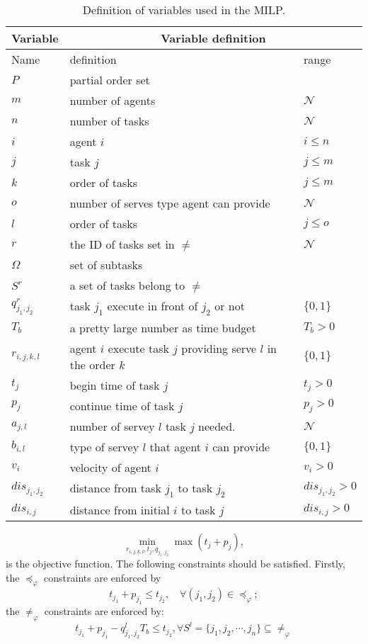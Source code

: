 \begin{table}[t]
	\begin{tabular}{|l|p{}|p{}|}\hline
		Variable &\multicolumn{2}{c|}{ Variable definition }\\\hline
		Name & definition & range \\
		$P$ & partial order set& \\
		$m$  & number of agents & $\mathcal{N}$\\
		$n$ & number of tasks & $\mathcal{N}$ \\
		$i$ & agent $i$ & $i\leq n$\\
		$j$ & task $j$ & $j\leq m$	\\
		$k$ & order of tasks & $j\leq m$\\
		$o$ & number of serves type agent can provide & $ \mathcal{N}$\\
		$l$ & order of tasks & $j\leq o$\\
		$r$ & the ID of tasks set in $\neq$ & $\mathcal{N}$\\
		$\Omega$ & set of subtasks &\\
		$S^r$& a set of tasks belong to $\neq$ &\\
		$q^r_{j_1,j_2}$ &task $j_1$ execute in front of $j_2$ or not& $\{0,1\}$\\
		$T_b$ & a pretty large number as time budget & $T_b>0$ \\
		$r_{i,j,k,l}$ & agent $i$ execute task $j$ providing serve $l$ in the order $k$ & $\{0,1\}$\\
		$t_j$ & begin time of task $j$ & $t_j>0$ \\
		$p_j$ & continue time of task $j$ & $p_j >0$\\
		$a_{j,l}$ & number of servey $l$ task $j$ needed. & $\mathcal{N}$\\
		$b_{i,l}$ & type of servey $l$ that agent $i$ can provide & $\{0,1\}$ \\
		$v_i$ & velocity of agent $i$ &   $v_i>0$\\
		$dis_{j_1,j_2}$ & distance from task $j_1$ to task $j_2$ &  $dis_{j_1,j_2}>0$\\
		$dis_{i,j}$ & distance from initial $i$ to task $j$ & $dis_{i,j}>0$\\\hline
	\end{tabular}
	\centering
	\caption{Definition of variables used in the MILP.}
	\label{tab:variables}
\end{table}
\begin{equation}
\min_{r_{i,j,k,l}, t_j,q_{j_1,j_2}}  \max(t_j+p_j),
\label{0}
\end{equation}
is the objective function.
The following constraints should be satisfied.
Firstly, the $\preceq_{\varphi}$ constraints are enforced by
\begin{equation}
t_{j_1}+p_{j_1}\leq t_{j_2}, \quad  \forall (j_1,j_2)\in \preceq_{\varphi};
\label{1}
\end{equation}
the $\neq_{\varphi}$ constraints are enforced by:
\begin{equation}
 t_{j_1}+p_{j_1}-q^l_{j_1,j_2}T_b\leq t_{j_2}, \forall S^l=\{j_1,j_2,\cdots,j_n\}\subseteq \neq_{\varphi}
 \label{1.5}
\end{equation}

